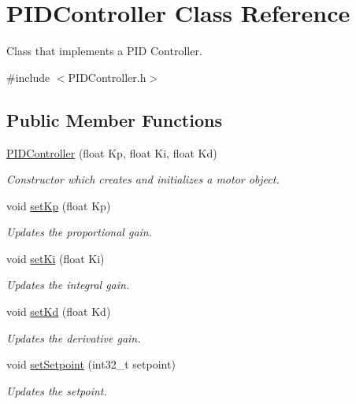 \hypertarget{class_p_i_d_controller}{}\section{P\+I\+D\+Controller Class Reference}
\label{class_p_i_d_controller}


Class that implements a P\+ID Controller.  




{\ttfamily \#include $<$P\+I\+D\+Controller.\+h$>$}

\subsection*{Public Member Functions}
\begin{DoxyCompactItemize}
\item 
\mbox{\hyperlink{class_p_i_d_controller_a4385346211da5ffcd4872f9a77a40b6b}{P\+I\+D\+Controller}} (float Kp, float Ki, float Kd)
\begin{DoxyCompactList}\small\item\em Constructor which creates and initializes a motor object. \end{DoxyCompactList}\item 
void \mbox{\hyperlink{class_p_i_d_controller_aa3f88f9bfd07c96e1af116056ea2f368}{set\+Kp}} (float Kp)
\begin{DoxyCompactList}\small\item\em Updates the proportional gain. \end{DoxyCompactList}\item 
void \mbox{\hyperlink{class_p_i_d_controller_a8d9a587dbc3d2432e6927551402d81d7}{set\+Ki}} (float Ki)
\begin{DoxyCompactList}\small\item\em Updates the integral gain. \end{DoxyCompactList}\item 
void \mbox{\hyperlink{class_p_i_d_controller_aa6fd9ebf0835ad90a20f38df6615e1f3}{set\+Kd}} (float Kd)
\begin{DoxyCompactList}\small\item\em Updates the derivative gain. \end{DoxyCompactList}\item 
void \mbox{\hyperlink{class_p_i_d_controller_a1afeb11fdafe29e44a61c49502990dd0}{set\+Setpoint}} (int32\+\_\+t setpoint)
\begin{DoxyCompactList}\small\item\em Updates the setpoint. \end{DoxyCompactList}\item 

\end{DoxyCompactItemize}
